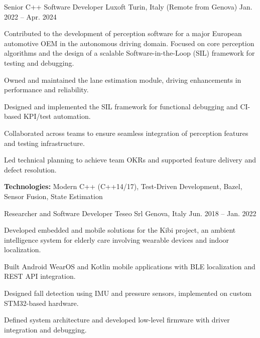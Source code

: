 \begin{cventries}
  \cventry
  {Senior C++ Software Developer} %
  {Luxoft} %
  {Turin, Italy (Remote from Genova) } %
  {Jan. 2022 -- Apr. 2024} %
  {
    Contributed to the development of perception software for a major European automotive OEM in the autonomous driving domain. Focused on core perception algorithms and the design of a scalable Software-in-the-Loop (SIL) framework for testing and debugging.
    \vspace{2em}
    \begin{cvitems}
    \item {Owned and maintained the lane estimation module, driving enhancements in performance and reliability.}
    \item {Designed and implemented the SIL framework for functional debugging and CI-based KPI/test automation.}
    \item {Collaborated across teams to ensure seamless integration of perception features and testing infrastructure.}
    \item {Led technical planning to achieve team OKRs and supported feature delivery and defect resolution.}
    \item {\textbf{Technologies:} Modern C++ (C++14/17), Test-Driven Development, Bazel, Sensor Fusion, State Estimation}
    \end{cvitems}
  }

  \cventry
  {Researcher and Software Developer} %
  {Teseo Srl} %
  {Genova, Italy} %
  {Jun. 2018 -- Jan. 2022} %
  {
    Developed embedded and mobile solutions for the Kibi project, an ambient intelligence system for elderly care involving wearable devices and indoor localization.
    \vspace{2em}
    \begin{cvitems}
    \item {Built Android WearOS and Kotlin mobile applications with BLE localization and REST API integration.}
    \item {Designed fall detection using IMU and pressure sensors, implemented on custom STM32-based hardware.}
    \item {Defined system architecture and developed low-level firmware with driver integration and debugging.}
    \end{cvitems}
  }


\end{cventries}
